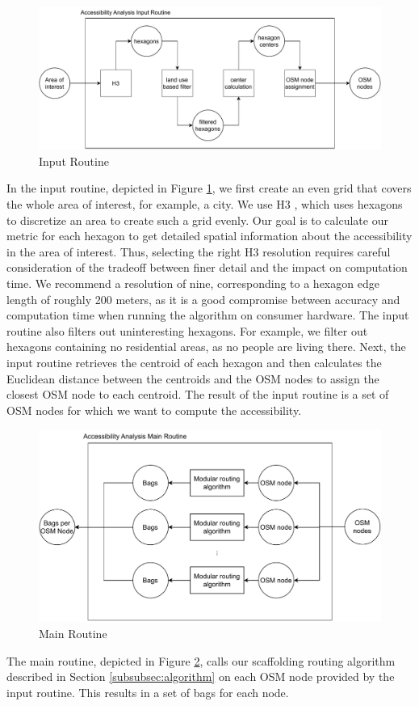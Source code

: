 \begin{figure}
    \centering
    \includegraphics[scale=0.50]{Figures/method/input_routine}
    \caption{Input Routine}
    \label{fig:input_routine}
\end{figure}
In the input routine, depicted in Figure \ref{fig:input_routine}, we first create an even grid that covers the whole area of interest, for example, a city.
We use H3 , which uses hexagons to discretize an area to create such a grid evenly.
Our goal is to calculate our metric for each hexagon to get detailed spatial information about the accessibility in the area of interest.
Thus, selecting the right H3 resolution requires careful consideration of the tradeoff between finer detail and the impact on computation time.
We recommend a resolution of nine, corresponding to a hexagon edge length of roughly 200 meters, as it is a good compromise between accuracy and computation time when running the algorithm on consumer hardware. 
The input routine also filters out uninteresting hexagons.
For example, we filter out hexagons containing no residential areas, as no people are living there.
Next, the input routine retrieves the centroid of each hexagon and then calculates the Euclidean distance between the centroids and the OSM nodes to assign the closest OSM node to each centroid.
The result of the input routine is a set of OSM nodes for which we want to compute the accessibility.


\begin{figure}
    \centering
    \includegraphics[scale=0.50]{Figures/method/main_routine}
    \caption{Main Routine}
    \label{fig:main_routine}
\end{figure}
The main routine, depicted in Figure \ref{fig:main_routine}, calls our scaffolding routing algorithm described in Section \ref{subsubsec:algorithm} on each OSM node provided by the input routine.
This results in a set of bags for each node.

